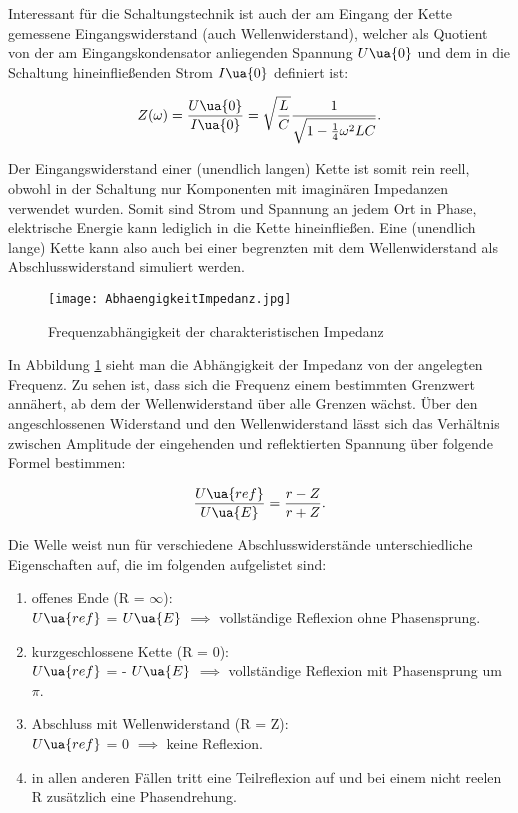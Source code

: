 Interessant für die Schaltungstechnik ist auch der am Eingang der Kette gemessene
Eingangswiderstand (auch Wellenwiderstand), welcher als Quotient von der am Eingangskondensator anliegenden
Spannung $U\ua{0}$ und dem in die Schaltung hineinfließenden Strom $I\ua{0}$
definiert ist:

\begin{equation}
  Z(\omega) = \frac{U\ua{0}}{I\ua{0}} = \sqrt{ \frac{L}{C}} \frac{1}{ \sqrt{1 - \frac{1}{4} \omega^2 LC} }.
\end{equation}

Der Eingangswiderstand einer (unendlich langen) Kette ist somit rein reell,
obwohl in der Schaltung nur Komponenten mit imaginären Impedanzen verwendet wurden.
Somit sind Strom und Spannung an jedem Ort in
Phase, elektrische Energie kann lediglich in die Kette hineinfließen. Eine
(unendlich lange) Kette kann also auch bei einer begrenzten mit dem Wellenwiderstand
als Abschlusswiderstand simuliert werden.

\begin{figure}
  \texttt{[image: AbhaengigkeitImpedanz.jpg]}
  \caption{Frequenzabhängigkeit der charakteristischen Impedanz \cite{anleitung01}}
  \label{fig:Impedanzabhängigkeit}
\end{figure}

In Abbildung \ref{fig:Impedanzabhängigkeit} sieht man die Abhängigkeit der Impedanz
von der angelegten Frequenz. Zu sehen ist, dass sich die Frequenz einem bestimmten
Grenzwert annähert, ab dem der Wellenwiderstand über alle Grenzen wächst.
Über den angeschlossenen Widerstand und den Wellenwiderstand lässt sich das
Verhältnis zwischen Amplitude der eingehenden und reflektierten Spannung über folgende
Formel bestimmen:

\begin{equation}
  \frac{U\ua{ref}}{U\ua{E}} = \frac{r - Z}{r + Z}.
\end{equation}


Die Welle weist nun für verschiedene Abschlusswiderstände unterschiedliche
Eigenschaften auf, die im folgenden aufgelistet sind:


\renewcommand{\labelenumi}{\alph{enumi})}
\begin{enumerate}
  \item offenes Ende (R = $\infty$): \\
        $U\ua{ref}$ = $U\ua{E}$ $\implies$ vollständige Reflexion ohne Phasensprung.

  \item kurzgeschlossene Kette (R = 0): \\
        $U\ua{ref}$ = - $U\ua{E}$ $\implies$ vollständige Reflexion mit Phasensprung um $\pi$.

  \item Abschluss mit Wellenwiderstand (R = Z): \\
        $U\ua{ref}$ = 0 $\implies$ keine Reflexion.

  \item in allen anderen Fällen tritt eine Teilreflexion auf und bei einem nicht
        reelen R zusätzlich eine Phasendrehung.
\end{enumerate}

